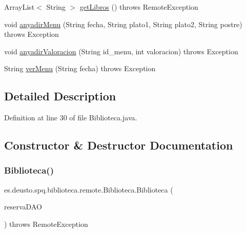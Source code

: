 \begin{DoxyCompactItemize}
\item 
Array\+List$<$ String $>$ \mbox{\hyperlink{classes_1_1deusto_1_1spq_1_1biblioteca_1_1remote_1_1_biblioteca_a9af87498dad047e3b371f17b3d29bcff}{get\+Libros}} ()  throws Remote\+Exception 
\item 
void \mbox{\hyperlink{classes_1_1deusto_1_1spq_1_1biblioteca_1_1remote_1_1_biblioteca_a144845bc1e837e9cb6a329ac30adbf39}{anyadir\+Menu}} (String fecha, String plato1, String plato2, String postre)  throws Exception 
\item 
void \mbox{\hyperlink{classes_1_1deusto_1_1spq_1_1biblioteca_1_1remote_1_1_biblioteca_a8657b2e8a0f290b26854518289c4b977}{anyadir\+Valoracion}} (String id\+\_\+menu, int valoracion)  throws Exception 
\item 
String \mbox{\hyperlink{classes_1_1deusto_1_1spq_1_1biblioteca_1_1remote_1_1_biblioteca_ad964168fdca53a12ab747247617f41c7}{ver\+Menu}} (String fecha)  throws Exception 
\end{DoxyCompactItemize}


\subsection{Detailed Description}


Definition at line 30 of file Biblioteca.\+java.



\subsection{Constructor \& Destructor Documentation}
\mbox{\label{classes_1_1deusto_1_1spq_1_1biblioteca_1_1remote_1_1_biblioteca_aac92372698896371d05bc2c52d0310b6}} 
\subsubsection{\texorpdfstring{Biblioteca()}{Biblioteca()}\hspace{0.1cm}{\footnotesize\ttfamily [1/6]}}
{\footnotesize\ttfamily es.\+deusto.\+spq.\+biblioteca.\+remote.\+Biblioteca.\+Biblioteca (\begin{DoxyParamCaption}\item[{\mbox{\hyperlink{interfacees_1_1deusto_1_1spq_1_1biblioteca_1_1dao_1_1_i_reserva_d_a_o}{I\+Reserva\+D\+AO}}}]{reserva\+D\+AO }\end{DoxyParamCaption}) throws Remote\+Exception}



